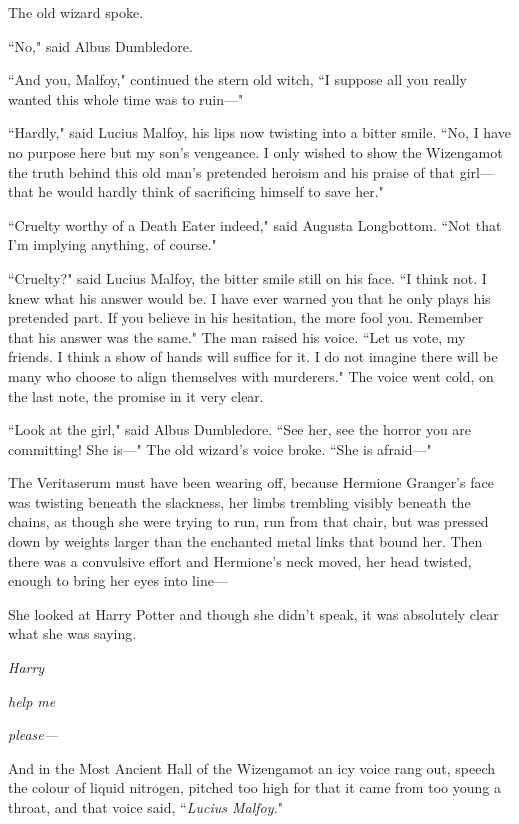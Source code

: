The old wizard spoke.

``No," said Albus Dumbledore.

``And you, Malfoy," continued the stern old witch, ``I suppose all you really wanted this whole time was to ruin—"

``Hardly," said Lucius Malfoy, his lips now twisting into a bitter smile. ``No, I have no purpose here but my son's vengeance. I only wished to show the Wizengamot the truth behind this old man's pretended heroism and his praise of that girl—that he would hardly think of sacrificing himself to save her."

``Cruelty worthy of a Death Eater indeed," said Augusta Longbottom. ``Not that I'm implying anything, of course."

``Cruelty?" said Lucius Malfoy, the bitter smile still on his face. ``I think not. I knew what his answer would be. I have ever warned you that he only plays his pretended part. If you believe in his hesitation, the more fool you. Remember that his answer was the same." The man raised his voice. ``Let us vote, my friends. I think a show of hands will suffice for it. I do not imagine there will be many who choose to align themselves with murderers." The voice went cold, on the last note, the promise in it very clear.

``Look at the girl," said Albus Dumbledore. ``See her, see the horror you are committing! She is—" The old wizard's voice broke. ``She is afraid—"

The Veritaserum must have been wearing off, because Hermione Granger's face was twisting beneath the slackness, her limbs trembling visibly beneath the chains, as though she were trying to run, run from that chair, but was pressed down by weights larger than the enchanted metal links that bound her. Then there was a convulsive effort and Hermione's neck moved, her head twisted, enough to bring her eyes into line—

She looked at Harry Potter and though she didn't speak, it was absolutely clear what she was saying.

\emph{Harry}

\emph{help me}

\emph{please—}

And in the Most Ancient Hall of the Wizengamot an icy voice rang out, speech the colour of liquid nitrogen, pitched too high for that it came from too young a throat, and that voice said, ``\emph{Lucius Malfoy.}"

\later

